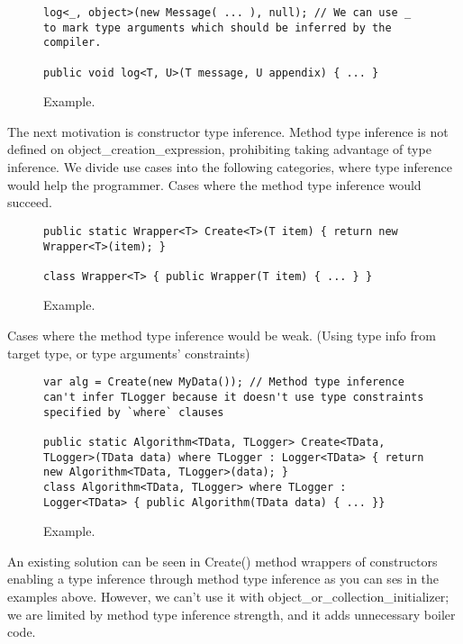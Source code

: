 \begin{figure}[h]
\begin{lstlisting}[style=csharp]
log<_, object>(new Message( ... ), null); // We can use _ to mark type arguments which should be inferred by the compiler.

public void log<T, U>(T message, U appendix) { ... }
\end{lstlisting}
\caption{Example.}
\label{img31}
\end{figure}
\par
The next motivation is constructor type inference. 
Method type inference is not defined on object\_creation\_expression, prohibiting taking advantage of type inference. 
We divide use cases into the following categories, where type inference would help the programmer.
Cases where the method type inference would succeed.
\begin{figure}[h]
\begin{lstlisting}[style=csharp]
public static Wrapper<T> Create<T>(T item) { return new Wrapper<T>(item); }

class Wrapper<T> { public Wrapper(T item) { ... } }
\end{lstlisting}
\caption{Example.}
\label{img32}
\end{figure}
\par
Cases where the method type inference would be weak. (Using type info from target type, or type arguments' constraints)
\begin{figure}[h]
\begin{lstlisting}[style=csharp]
var alg = Create(new MyData()); // Method type inference can't infer TLogger because it doesn't use type constraints specified by `where` clauses

public static Algorithm<TData, TLogger> Create<TData, TLogger>(TData data) where TLogger : Logger<TData> { return new Algorithm<TData, TLogger>(data); } 
class Algorithm<TData, TLogger> where TLogger : Logger<TData> { public Algorithm(TData data) { ... }}
\end{lstlisting}
\caption{Example.}
\label{img33}
\end{figure}
\par
An existing solution can be seen in Create() method wrappers of constructors enabling a type inference through method type inference as you can ses in the examples above. However, we can't use it with object\_or\_collection\_initializer; we are limited by method type inference strength, and it adds unnecessary boiler code.

